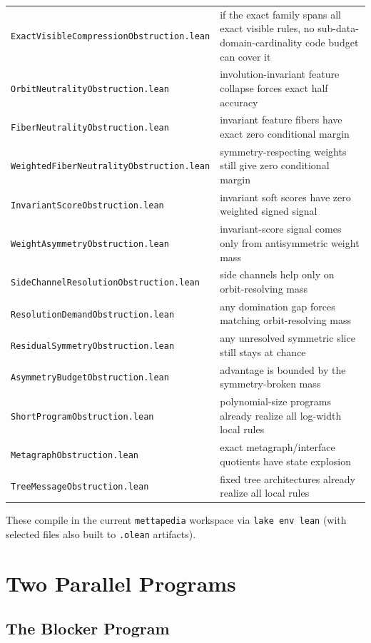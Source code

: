 \documentclass[11pt]{article}
\theoremstyle{remark}
\begin{document}
\begin{center}
\begin{tabular}{ll}
\texttt{ExactVisibleCompressionObstruction.lean} & if the exact family spans all exact visible rules, no sub-data-domain-cardinality code budget can cover it \\
\texttt{OrbitNeutralityObstruction.lean} & involution-invariant feature collapse forces exact half accuracy \\
\texttt{FiberNeutralityObstruction.lean} & invariant feature fibers have exact zero conditional margin \\
\texttt{WeightedFiberNeutralityObstruction.lean} & symmetry-respecting weights still give zero conditional margin \\
\texttt{InvariantScoreObstruction.lean} & invariant soft scores have zero weighted signed signal \\
\texttt{WeightAsymmetryObstruction.lean} & invariant-score signal comes only from antisymmetric weight mass \\
\texttt{SideChannelResolutionObstruction.lean} & side channels help only on orbit-resolving mass \\
\texttt{ResolutionDemandObstruction.lean} & any domination gap forces matching orbit-resolving mass \\
\texttt{ResidualSymmetryObstruction.lean} & any unresolved symmetric slice still stays at chance \\
\texttt{AsymmetryBudgetObstruction.lean} & advantage is bounded by the symmetry-broken mass \\
\texttt{ShortProgramObstruction.lean} & polynomial-size programs already realize all log-width local rules \\
\texttt{MetagraphObstruction.lean} & exact metagraph/interface quotients have state explosion \\
\texttt{TreeMessageObstruction.lean} & fixed tree architectures already realize all local rules \\
\bottomrule
\end{tabular}
\end{center}

These compile in the current \texttt{mettapedia} workspace via \texttt{lake env lean}
(with selected files also built to \texttt{.olean} artifacts).

\section{Two Parallel Programs}

\subsection{The Blocker Program}
\end{document}

